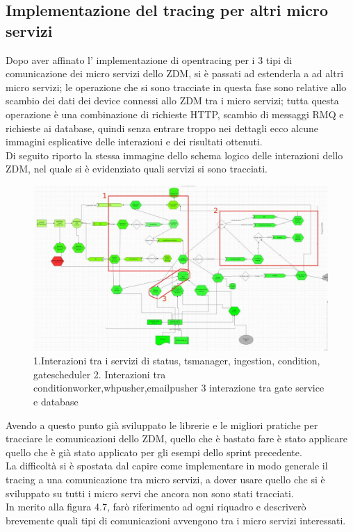\documentclass[a4paper,12pt,titlepage,italian,openany]{report}
\begin{document}
\subsection{Implementazione del tracing per altri micro servizi}
Dopo aver affinato l' implementazione di  opentracing per i 3 tipi di comunicazione dei micro servizi dello ZDM\cite{zdm:1}, si è passati ad estenderla a ad altri micro servizi;
le operazione che si sono tracciate in questa fase sono relative allo scambio dei dati dei device connessi allo ZDM\cite{zdm:1} tra i micro servizi; tutta questa operazione è una combinazione di richieste HTTP, scambio di messaggi RMQ e richieste ai database, quindi senza entrare troppo nei dettagli ecco alcune immagini esplicative delle interazioni e dei risultati ottenuti.\\
Di seguito riporto la stessa immagine dello schema logico delle interazioni dello ZDM\cite{zdm:1}, nel quale si è evidenziato quali servizi si sono tracciati.
\begin{figure}[H]
    \includegraphics[scale=0.3]{61.jpg}
    \centering
    \caption{1.Interazioni tra i servizi di status, tsmanager, ingestion, condition, gatescheduler 2. Interazioni tra conditionworker,whpusher,emailpusher 3 interazione tra gate service e database}
\end{figure}

Avendo a questo punto già sviluppato le librerie e le migliori pratiche per tracciare le comunicazioni dello ZDM\cite{zdm:1}, quello che è bastato fare è stato applicare quello che è già stato applicato per gli esempi dello sprint precedente.
\\ La difficoltà si è spostata dal capire come implementare in modo generale il tracing a una comunicazione tra micro servizi, a dover usare quello che si è sviluppato su tutti i micro servi che ancora non sono stati tracciati.\\
In merito alla figura 4.7, farò  riferimento ad ogni riquadro e descriverò brevemente quali tipi di comunicazioni avvengono tra i micro servizi interessati.
\end{document}
